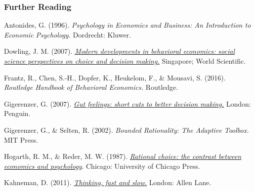 \documentclass[
  x11names]{article}
\begin{document}
\setlength{\leftskip}{0in}

\subsubsection{Further Reading}\label{further-reading}

\noindent \vspace{-2em} \setlength{\parindent}{-0.5in}
\setlength{\leftskip}{0.5in} \setlength{\parskip}{7.5pt}

Antonides, G. (1996). \emph{Psychology in Economics and Business: An
Introduction to Economic Psychology.} Dordrecht: Kluwer.

Dowling, J. M. (2007).
\href{https://uol.primo.exlibrisgroup.com/discovery/fulldisplay?docid=alma991001565039703496&context=L&vid=353UOL_INST:353UOL_VU1&lang=en&search_scope=MyInst_and_CI&adaptor=Local\%20Search\%20Engine&tab=TAB1&query=any,contains,Modern\%20developments\%20in\%20behavioral\%20economics:\%20social\%20science\%20perspectives\%20on\%20choice\%20and\%20decision\%20making&sortby=rank&offset=0}{\color{blue}\emph{Modern
developments in behavioral economics: social science perspectives on
choice and decision making.}\color{black}} Singapore; World Scientific.

Frantz, R., Chen, S.-H., Dopfer, K., Heukelom, F., \& Mousavi, S.
(2016). \emph{Routledge Handbook of Behavioral Economics.} Routledge.

Gigerenzer, G. (2007).
\href{https://uol.primo.exlibrisgroup.com/discovery/fulldisplay?docid=alma991001060349703496&context=L&vid=353UOL_INST:353UOL_VU1&lang=en&search_scope=MyInst_and_CI&adaptor=Local\%20Search\%20Engine&tab=TAB1&query=any,contains,gut\%20feelings&sortby=rank}{\color{blue}\emph{Gut
feelings: short cuts to better decision making.}\color{black}} London:
Penguin.

Gigerenzer, G., \& Selten, R. (2002). \emph{Bounded Rationality: The
Adaptive Toolbox.} MIT Press.

Hogarth, R. M., \& Reder, M. W. (1987).
\href{https://uol.primo.exlibrisgroup.com/discovery/fulldisplay?docid=alma991003403189703496&context=L&vid=353UOL_INST:353UOL_VU1&lang=en&search_scope=MyInst_and_CI&adaptor=Local\%20Search\%20Engine&tab=TAB1&query=any,contains,Rational\%20Choice:\%20The\%20Contrast\%20between\%20Economics\%20and\%20Psychology&sortby=rank}{\color{blue}\emph{Rational
choice: the contrast between economics and psychology}\color{black}}.
Chicago: University of Chicago Press.

Kahneman, D. (2011).
\href{https://uol.primo.exlibrisgroup.com/discovery/fulldisplay?docid=alma991001624339703496&context=L&vid=353UOL_INST:353UOL_VU1&lang=en&search_scope=MyInst_and_CI&adaptor=Local\%20Search\%20Engine&tab=TAB1&query=any,contains,Thinking,\%20fast\%20and\%20slow.&sortby=rank&offset=0}{\color{blue}\emph{Thinking,
fast and slow.}\color{black}} London: Allen Lane.
\end{document}

